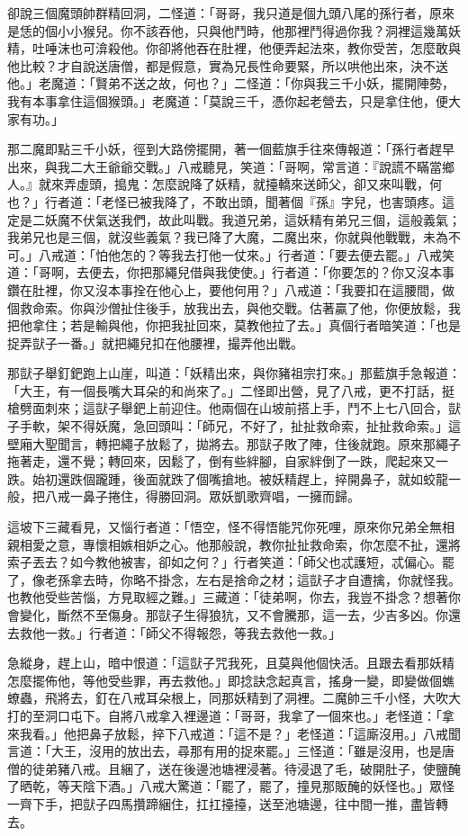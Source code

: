 卻說三個魔頭帥群精回洞，二怪道：「哥哥，我只道是個九頭八尾的孫行者，原來是恁的個小小猴兒。你不該吞他，只與他鬥時，他那裡鬥得過你我？洞裡這幾萬妖精，吐唾沫也可渰殺他。你卻將他吞在肚裡，他便弄起法來，教你受苦，怎麼敢與他比較？才自說送唐僧，都是假意，實為兄長性命要緊，所以哄他出來，決不送他。」老魔道：「賢弟不送之故，何也？」二怪道：「你與我三千小妖，擺開陣勢，我有本事拿住這個猴頭。」老魔道：「莫說三千，憑你起老營去，只是拿住他，便大家有功。」

那二魔即點三千小妖，徑到大路傍擺開，著一個藍旗手往來傳報道：「孫行者趕早出來，與我二大王爺爺交戰。」八戒聽見，笑道：「哥啊，常言道：『說謊不瞞當鄉人。』就來弄虛頭，搗鬼：怎麼說降了妖精，就擡轎來送師父，卻又來叫戰，何也？」行者道：「老怪已被我降了，不敢出頭，聞著個『孫』字兒，也害頭疼。這定是二妖魔不伏氣送我們，故此叫戰。我道兄弟，這妖精有弟兄三個，這般義氣；我弟兄也是三個，就沒些義氣？我已降了大魔，二魔出來，你就與他戰戰，未為不可。」八戒道：「怕他怎的？等我去打他一仗來。」行者道：「要去便去罷。」八戒笑道：「哥啊，去便去，你把那繩兒借與我使使。」行者道：「你要怎的？你又沒本事鑽在肚裡，你又沒本事拴在他心上，要他何用？」八戒道：「我要扣在這腰間，做個救命索。你與沙僧扯住後手，放我出去，與他交戰。估著贏了他，你便放鬆，我把他拿住；若是輸與他，你把我扯回來，莫教他拉了去。」真個行者暗笑道：「也是捉弄獃子一番。」就把繩兒扣在他腰裡，撮弄他出戰。

那獃子舉釘鈀跑上山崖，叫道：「妖精出來，與你豬祖宗打來。」那藍旗手急報道：「大王，有一個長嘴大耳朵的和尚來了。」二怪即出營，見了八戒，更不打話，挺槍劈面刺來；這獃子舉鈀上前迎住。他兩個在山坡前搭上手，鬥不上七八回合，獃子手軟，架不得妖魔，急回頭叫：「師兄，不好了，扯扯救命索，扯扯救命索。」這壁廂大聖聞言，轉把繩子放鬆了，拋將去。那獃子敗了陣，住後就跑。原來那繩子拖著走，還不覺；轉回來，因鬆了，倒有些絆腳，自家絆倒了一跌，爬起來又一跌。始初還跌個躘踵，後面就跌了個嘴搶地。被妖精趕上，捽開鼻子，就如蛟龍一般，把八戒一鼻子捲住，得勝回洞。眾妖凱歌齊唱，一擁而歸。

這坡下三藏看見，又惱行者道：「悟空，怪不得悟能咒你死哩，原來你兄弟全無相親相愛之意，專懷相嫉相妒之心。他那般說，教你扯扯救命索，你怎麼不扯，還將索子丟去？如今教他被害，卻如之何？」行者笑道：「師父也忒護短，忒偏心。罷了，像老孫拿去時，你略不掛念，左右是捨命之材；這獃子才自遭擒，你就怪我。也教他受些苦惱，方見取經之難。」三藏道：「徒弟啊，你去，我豈不掛念？想著你會變化，斷然不至傷身。那獃子生得狼犺，又不會騰那，這一去，少吉多凶。你還去救他一救。」行者道：「師父不得報怨，等我去救他一救。」

急縱身，趕上山，暗中恨道：「這獃子咒我死，且莫與他個快活。且跟去看那妖精怎麼擺佈他，等他受些罪，再去救他。」即捻訣念起真言，搖身一變，即變做個蟭蟟蟲，飛將去，釘在八戒耳朵根上，同那妖精到了洞裡。二魔帥三千小怪，大吹大打的至洞口屯下。自將八戒拿入裡邊道：「哥哥，我拿了一個來也。」老怪道：「拿來我看。」他把鼻子放鬆，捽下八戒道：「這不是？」老怪道：「這廝沒用。」八戒聞言道：「大王，沒用的放出去，尋那有用的捉來罷。」三怪道：「雖是沒用，也是唐僧的徒弟豬八戒。且綑了，送在後邊池塘裡浸著。待浸退了毛，破開肚子，使鹽醃了晒乾，等天陰下酒。」八戒大驚道：「罷了，罷了，撞見那販醃的妖怪也。」眾怪一齊下手，把獃子四馬攢蹄綑住，扛扛擡擡，送至池塘邊，往中間一推，盡皆轉去。

